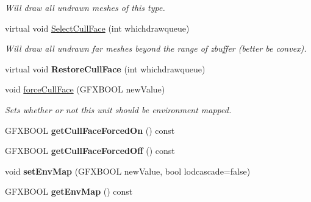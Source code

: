 \begin{DoxyCompactItemize}
\begin{DoxyCompactList}\small\item\em Will draw all undrawn meshes of this type. \end{DoxyCompactList}\item 
virtual void \hyperlink{classMesh_a3bce08f958963cf999e91da645b9e29a}{Select\+Cull\+Face} (int whichdrawqueue)\hypertarget{classMesh_a3bce08f958963cf999e91da645b9e29a}{}\label{classMesh_a3bce08f958963cf999e91da645b9e29a}

\begin{DoxyCompactList}\small\item\em Will draw all undrawn far meshes beyond the range of zbuffer (better be convex). \end{DoxyCompactList}\item 
virtual void {\bfseries Restore\+Cull\+Face} (int whichdrawqueue)\hypertarget{classMesh_a28e47cd8c0e96f3b7b7278f01215c43c}{}\label{classMesh_a28e47cd8c0e96f3b7b7278f01215c43c}

\item 
void \hyperlink{classMesh_aaae9a0433ceefc4bb82ca50e357a2318}{force\+Cull\+Face} (G\+F\+X\+B\+O\+OL new\+Value)\hypertarget{classMesh_aaae9a0433ceefc4bb82ca50e357a2318}{}\label{classMesh_aaae9a0433ceefc4bb82ca50e357a2318}

\begin{DoxyCompactList}\small\item\em Sets whether or not this unit should be environment mapped. \end{DoxyCompactList}\item 
G\+F\+X\+B\+O\+OL {\bfseries get\+Cull\+Face\+Forced\+On} () const \hypertarget{classMesh_abc1ff74c6bdb8289685661757cec81d1}{}\label{classMesh_abc1ff74c6bdb8289685661757cec81d1}

\item 
G\+F\+X\+B\+O\+OL {\bfseries get\+Cull\+Face\+Forced\+Off} () const \hypertarget{classMesh_a57e8a7419b74a57f54721adb4a71856e}{}\label{classMesh_a57e8a7419b74a57f54721adb4a71856e}

\item 
void {\bfseries set\+Env\+Map} (G\+F\+X\+B\+O\+OL new\+Value, bool lodcascade=false)\hypertarget{classMesh_a48b9d07af4622e2f2f4f034d62c661ac}{}\label{classMesh_a48b9d07af4622e2f2f4f034d62c661ac}

\item 
G\+F\+X\+B\+O\+OL {\bfseries get\+Env\+Map} () const \hypertarget{classMesh_a784ca8d070ae2f7c83999b34720d7c99}{}\label{classMesh_a784ca8d070ae2f7c83999b34720d7c99}


\end{DoxyCompactItemize}
